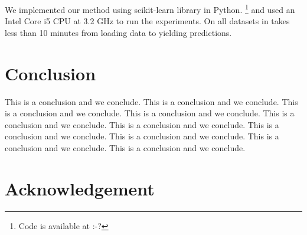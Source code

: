 We implemented our method using scikit-learn library \cite{} in Python.
\footnote{Code is available at :-?}
 and used an Intel Core i5 CPU at 3.2 GHz to run the experiments.
On all datasets in takes less than 10 minutes from loading data to yielding predictions.

\section{Conclusion} \label{conclusion}
This is a conclusion and we conclude.
This is a conclusion and we conclude.
This is a conclusion and we conclude.
This is a conclusion and we conclude.
This is a conclusion and we conclude.
This is a conclusion and we conclude.
This is a conclusion and we conclude.
This is a conclusion and we conclude.
This is a conclusion and we conclude.
This is a conclusion and we conclude.

\section*{Acknowledgement}
{\small


}
